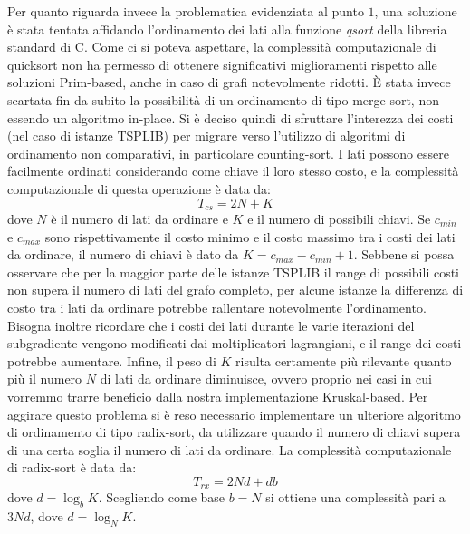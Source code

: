 Per quanto riguarda invece la problematica evidenziata al punto $1$, una soluzione è stata tentata affidando l'ordinamento dei lati alla funzione \emph{qsort} della libreria standard di C. Come ci si poteva aspettare, la complessità computazionale di quicksort non ha permesso di ottenere significativi miglioramenti rispetto alle soluzioni Prim-based, anche in caso di grafi notevolmente ridotti. È stata invece scartata fin da subito la possibilità di un ordinamento di tipo merge-sort, non essendo un algoritmo in-place. Si è deciso quindi di sfruttare l'interezza dei costi (nel caso di istanze TSPLIB) per migrare verso l'utilizzo di algoritmi di ordinamento non comparativi, in particolare counting-sort. I lati possono essere facilmente ordinati considerando come chiave il loro stesso costo, e la complessità computazionale di questa operazione è data da:
\begin{equation}
T_{cs} = 2 N + K
\end{equation}
dove $N$ è il numero di lati da ordinare e $K$ e il numero di possibili chiavi. Se $c_{min}$ e $c_{max}$ sono rispettivamente il costo minimo e il costo massimo tra i costi dei lati da ordinare, il numero di chiavi è dato da $K = c_{max} - c_{min} + 1$. Sebbene si possa osservare che per la maggior parte delle istanze TSPLIB il range di possibili costi non supera il numero di lati del grafo completo, per alcune istanze la differenza di costo tra i lati da ordinare potrebbe rallentare notevolmente l'ordinamento. Bisogna inoltre ricordare che i costi dei lati durante le varie iterazioni del subgradiente vengono modificati dai moltiplicatori lagrangiani, e il range dei costi potrebbe aumentare. Infine, il peso di $K$ risulta certamente più rilevante quanto più il numero $N$ di lati da ordinare diminuisce, ovvero proprio nei casi in cui vorremmo trarre beneficio dalla nostra implementazione Kruskal-based. Per aggirare questo problema si è reso necessario implementare un ulteriore algoritmo di ordinamento di tipo radix-sort, da utilizzare quando il numero di chiavi supera di una certa soglia il numero di lati da ordinare. La complessità computazionale di radix-sort è data da:
\begin{equation}
T_{rx} = 2 N d  + d b
\end{equation}
dove $d = \log_b{K}$. Scegliendo come base $b = N$ si ottiene una complessità pari a $3 N d$, dove $d = \log_N{K}$. 

